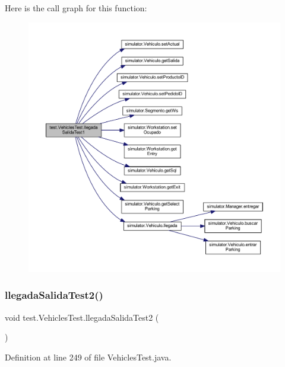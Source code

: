 Here is the call graph for this function\+:\nopagebreak
\begin{figure}[H]
\begin{center}
\leavevmode
\includegraphics[width=350pt]{classtest_1_1_vehicles_test_af6b183cd52a3b39d3e565d3e92a85487_cgraph}
\end{center}
\end{figure}
\mbox{\label{classtest_1_1_vehicles_test_a7345ea4de2d3d0f0ebd9fd8d7701c13f}} 
\subsubsection{\texorpdfstring{llegada\+Salida\+Test2()}{llegadaSalidaTest2()}}
{\footnotesize\ttfamily void test.\+Vehicles\+Test.\+llegada\+Salida\+Test2 (\begin{DoxyParamCaption}{ }\end{DoxyParamCaption})}



Definition at line 249 of file Vehicles\+Test.\+java.

